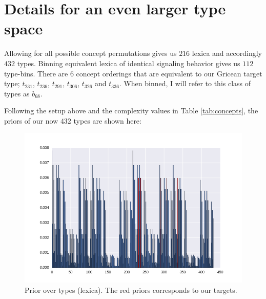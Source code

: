 \documentclass[a4paper]{article}
\begin{document}
\newpage

\section*{Details for an even larger type space}

Allowing for all possible concept permutations gives us $216$ lexica and accordingly $432$ types. Binning equivalent lexica of identical signaling behavior gives us $112$ type-bins. There are $6$ concept orderings that are equivalent to our Gricean target type; $t_{231}$, $t_{236}$, $t_{291}$, $t_{306}$, $t_{326}$ and $t_{336}$. When binned, I will refer to this class of types as $b_{68}$.

Following the setup above and the complexity values in Table \ref{tab:concepts}, the priors of our now $432$ types are shown here:

\begin{figure}[h!]
  \centering
  \includegraphics[scale=.35]{../code-LOT-extension/plots/priors-meFalse432.png} %
  \caption{Prior over types (lexica). The red priors corresponds to our targets.}
  \label{fig:priors}
\end{figure}
\end{document}
